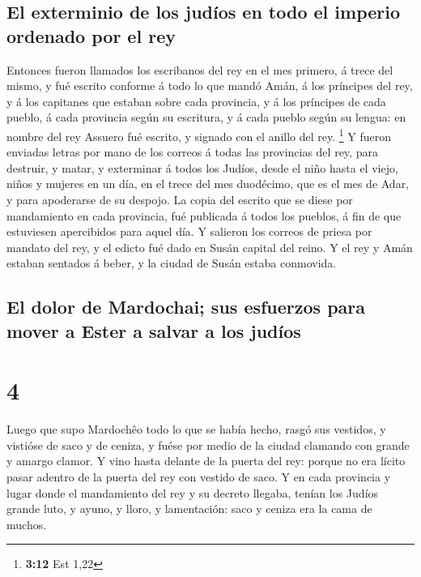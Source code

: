 \hypertarget{el-exterminio-de-los-juduxedos-en-todo-el-imperio-ordenado-por-el-rey}{%
\subsection{El exterminio de los judíos en todo el imperio ordenado por
el
rey}\label{el-exterminio-de-los-juduxedos-en-todo-el-imperio-ordenado-por-el-rey}}

 Entonces fueron llamados los escribanos del rey en el mes
primero, á trece del mismo, y fué escrito conforme á todo lo que mandó
Amán, á los príncipes del rey, y á los capitanes que estaban sobre cada
provincia, y á los príncipes de cada pueblo, á cada provincia según su
escritura, y á cada pueblo según su lengua: en nombre del rey Assuero
fué escrito, y signado con el anillo del rey. \footnote{\textbf{3:12}
  Est 1,22}  Y fueron enviadas letras por mano de los
correos á todas las provincias del rey, para destruir, y matar, y
exterminar á todos los Judíos, desde el niño hasta el viejo, niños y
mujeres en un día, en el trece del mes duodécimo, que es el mes de Adar,
y para apoderarse de su despojo.  La copia del escrito que
se diese por mandamiento en cada provincia, fué publicada á todos los
pueblos, á fin de que estuviesen apercibidos para aquel día.
 Y salieron los correos de priesa por mandato del rey, y el
edicto fué dado en Susán capital del reino. Y el rey y Amán estaban
sentados á beber, y la ciudad de Susán estaba conmovida.

\hypertarget{el-dolor-de-mardochai-sus-esfuerzos-para-mover-a-ester-a-salvar-a-los-juduxedos}{%
\subsection{El dolor de Mardochai; sus esfuerzos para mover a Ester a
salvar a los
judíos}\label{el-dolor-de-mardochai-sus-esfuerzos-para-mover-a-ester-a-salvar-a-los-juduxedos}}

\hypertarget{section-3}{%
\section{4}\label{section-3}}

 Luego que supo Mardochêo todo lo que se había hecho, rasgó
sus vestidos, y vistióse de saco y de ceniza, y fuése por medio de la
ciudad clamando con grande y amargo clamor.  Y vino hasta
delante de la puerta del rey: porque no era lícito pasar adentro de la
puerta del rey con vestido de saco.  Y en cada provincia y
lugar donde el mandamiento del rey y su decreto llegaba, tenían los
Judíos grande luto, y ayuno, y lloro, y lamentación: saco y ceniza era
la cama de muchos.

